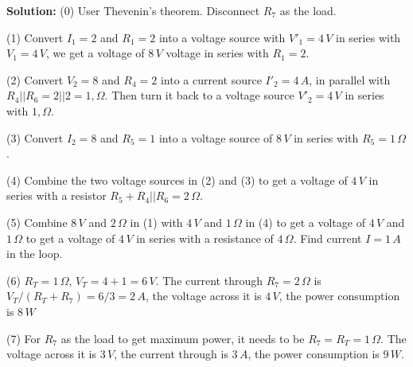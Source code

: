   {\bf Solution:} 
  (0) User Thevenin's theorem. Disconnect $R_7$ as the load.

  (1) Convert $I_1=2$ and $R_1=2$ into a voltage source with $V'_1=4\,V$
  in series with $V_1=4\,V$, we get a voltage of $8\,V$ voltage in series 
  with $R_1=2$. 
  
  (2) Convert $V_2=8$ and $R_4=2$ into a current source $I'_2=4\,A$, in 
  parallel with $R_4||R_6=2||2=1,\Omega$. Then turn it back to a voltage 
  source $V'_2=4\,V$ in series with $1,\Omega$. 

  (3) Convert $I_2=8$ and $R_5=1$ into a voltage source of $8\,V$ in series
  with $R_5=1\,\Omega$.

  (4) Combine the two voltage sources in (2) and (3) to get a voltage of 
  $4\,V$ in series with a resistor $R_5+R_4||R_6=2\,\Omega$.

  (5) Combine $8\,V$ and $2\,\Omega$ in (1) with $4\,V$ and $1\,\Omega$ 
  in (4) to get a voltage of $4\,V$ and $1\,\Omega$ to get a voltage of 
  $4\,V$ in series with a resistance of $4\,\Omega$. Find current $I=1\,A$
  in the loop.

  (6) $R_T=1\,\Omega$, $V_T=4+1=6\,V$. The current through $R_7=2\,\Omega$
  is $V_T/(R_T+R_7)=6/3=2\,A$, the voltage across it is $4\,V$, the power
  consumption is $8\,W$

  (7) For $R_7$ as the load to get maximum power, it needs to be 
  $R_7=R_T=1\,\Omega$. The voltage across it is $3\,V$, the current 
  through is $3\,A$, the power consumption is $9\,W$.
